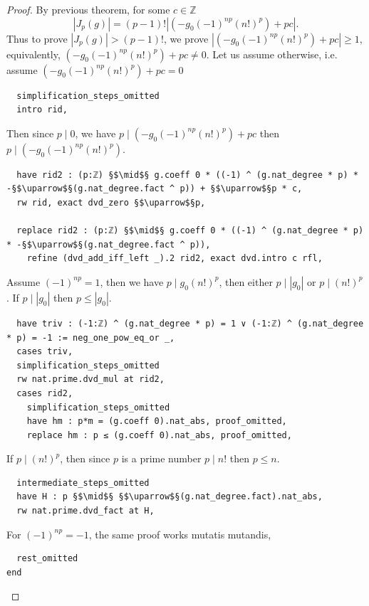 \documentclass{report}
\theoremstyle{definition}
\begin{document}
\begin{proof}
By previous theorem, for some $c\in\mathbb Z$
$$
|J_p(g)|=(p-1)!\left|(-g_0(-1)^{np}(n!)^p)+pc\right|.
$$
Thus to prove $|J_p(g)|>(p-1)!$, we prove $\left|(-g_0(-1)^{np}(n!)^p)+pc\right| \ge 1$, equivalently, $(-g_0(-1)^{np}(n!)^p)+pc\ne0$. Let us assume otherwise, i.e. assume $(-g_0(-1)^{np}(n!)^p)+pc=0$
\begin{verbatim}
  simplification_steps_omitted
  intro rid,
\end{verbatim}

Then since $p\mid 0$, we have $p\mid (-g_0(-1)^{np}(n!)^p)+pc$ then $p\mid(-g_0(-1)^{np}(n!)^p)$.
\begin{verbatim}
  have rid2 : (p:ℤ) §$\mid$§ g.coeff 0 * ((-1) ^ (g.nat_degree * p) * -§$\uparrow$§(g.nat_degree.fact ^ p)) + §$\uparrow$§p * c,
  rw rid, exact dvd_zero §$\uparrow$§p,
  
  replace rid2 : (p:ℤ) §$\mid$§ g.coeff 0 * ((-1) ^ (g.nat_degree * p) * -§$\uparrow$§(g.nat_degree.fact ^ p)),
    refine (dvd_add_iff_left _).2 rid2, exact dvd.intro c rfl,
\end{verbatim}

Assume $(-1)^{np}=1$, then we have $p\mid g_0 (n!)^p$, then either $p\mid |g_0|$ or $p\mid (n!)^p$. If $p\mid |g_0|$ then $p\le |g_0|$.
\begin{verbatim}
  have triv : (-1:ℤ) ^ (g.nat_degree * p) = 1 ∨ (-1:ℤ) ^ (g.nat_degree * p) = -1 := neg_one_pow_eq_or _,
  cases triv,
  simplification_steps_omitted
  rw nat.prime.dvd_mul at rid2,
  cases rid2,
    simplification_steps_omitted
    have hm : p*m = (g.coeff 0).nat_abs, proof_omitted,
    replace hm : p ≤ (g.coeff 0).nat_abs, proof_omitted,
\end{verbatim}

If $p\mid (n!)^p$, then since $p$ is a prime number $p\mid n!$  then $p\le n$.
\begin{verbatim}
  intermediate_steps_omitted
  have H : p §$\mid$§ §$\uparrow$§(g.nat_degree.fact).nat_abs,
  rw nat.prime.dvd_fact at H,
\end{verbatim}

For $(-1)^{np}=-1$, the same proof works mutatis mutandis,
\begin{verbatim}
  rest_omitted
end
\end{verbatim}
\end{proof}
\end{document}
